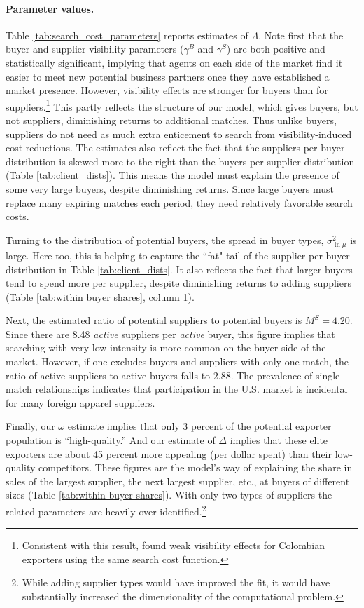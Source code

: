 \documentclass[12pt]{article} \usepackage{amsmath,amssymb,amsthm,geometry,graphicx,setspace,algorithm,algpseudocode,float}
\begin{document}
\paragraph{Parameter values.}  Table \ref{tab:search_cost_parameters} reports estimates of $\Lambda$. Note first that the buyer and supplier visibility parameters ($\gamma ^{B}$ and $\gamma ^{S}$) are both positive and statistically significant, implying that agents on each side of the market find it easier to meet new potential business partners once they have established a market presence. However, visibility effects are stronger for buyers than for suppliers.\footnote{Consistent with this result, \citet{eaton2014a} found weak visibility effects for Colombian exporters using the same search cost function\medskip.} 
This partly reflects the structure of our model, which gives buyers, but not suppliers, diminishing returns to additional matches. Thus unlike buyers, suppliers do not need as much  extra enticement to search from visibility-induced cost reductions. The estimates also reflect the fact that the suppliers-per-buyer distribution is skewed more to the right than the buyers-per-supplier distribution (Table \ref{tab:client_dists}). This means the model must explain the presence of some very large buyers, despite diminishing returns. Since large buyers must replace many expiring matches each period, they need relatively favorable search costs.
\par
Turning to the distribution of potential buyers, the spread in buyer types, $\sigma^2_{\ln \mu}$ is large. Here too, this is helping to capture the ``fat" tail of the supplier-per-buyer distribution in Table \ref{tab:client_dists}. It also reflects the fact that larger buyers tend to spend more per supplier, despite diminishing returns to adding suppliers (Table \ref{tab:within buyer shares}, column 1).
\par
Next, the estimated ratio of potential suppliers to potential buyers is $M^{S}=4.20$. Since there are 8.48 \textit{active} suppliers per \textit{active} buyer, this figure implies that searching with very low intensity is more common on the buyer side of the market. However, if one excludes buyers and suppliers with only one match, the ratio of active suppliers to active buyers falls to 2.88. The prevalence of single match relationships indicates that participation in the U.S. market is incidental for many foreign apparel suppliers. 
\par
Finally, our $\omega$ estimate implies that only 3 percent of the potential exporter population is ``high-quality.'' And our estimate of $\Delta$ implies that these elite exporters are about 45 percent more appealing (per dollar spent) than their low-quality competitors. These figures are the model's way of explaining the share in sales of the largest supplier, the next largest supplier, etc., at buyers  of different sizes (Table \ref{tab:within buyer shares}). With only two types of suppliers the related parameters are heavily over-identified.\footnote{While adding supplier types would have improved the fit, it would have substantially increased the dimensionality of the computational
problem.\medskip} 
\end{document}
